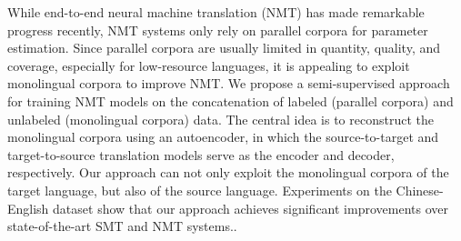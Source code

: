 While end-to-end neural machine translation (NMT) has made remarkable progress recently, NMT systems only rely on parallel corpora for parameter estimation. Since parallel corpora are usually limited in quantity, quality, and coverage, especially for low-resource languages, it is appealing to exploit monolingual corpora to improve NMT. We propose a semi-supervised approach for training NMT models on the concatenation of labeled (parallel corpora) and unlabeled (monolingual corpora) data. The central idea is to reconstruct the monolingual corpora using an autoencoder, in which the source-to-target and target-to-source translation models serve as the encoder and decoder, respectively. Our approach can not only exploit the monolingual corpora of the target language, but also of the source language. Experiments on the Chinese-English dataset show that our approach achieves significant improvements over state-of-the-art SMT and NMT systems..
